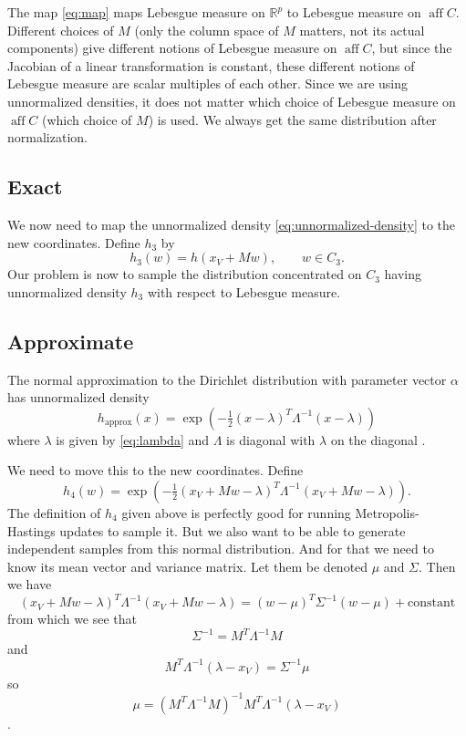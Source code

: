 \documentclass[11pt]{article}
\DeclareMathOperator{\aff}{aff}
\newcommand{\real}{\mathbb{R}}
\begin{document}
The map \eqref{eq:map} maps Lebesgue measure on $\real^p$ to Lebesgue measure
on $\aff C$.  Different choices of $M$ (only the column space of $M$ matters,
not its actual components) give different notions of Lebesgue measure on
$\aff C$, but since the Jacobian of a linear transformation is constant,
these different notions of Lebesgue measure are scalar multiples of each other.
Since we are using unnormalized densities, it does not matter which choice
of Lebesgue measure on $\aff C$ (which choice of $M$) is used.
We always get the same distribution after normalization.

\subsection{Exact}

We now need to map the unnormalized density \eqref{eq:unnormalized-density}
to the new coordinates.  Define $h_3$ by
\begin{equation} \label{eq:h-new}
   h_3(w) = h(x_V + M w), \qquad w \in C_3.
\end{equation}
Our problem is now to sample the distribution concentrated on $C_3$
having unnormalized density $h_3$ with respect to Lebesgue measure.

\subsection{Approximate} \label{sec:approximate}

The normal approximation to the Dirichlet distribution with
parameter vector $\alpha$ has unnormalized density
$$
   h_{\text{approx}}(x)
   =
   \exp\left(- \tfrac{1}{2} (x - \lambda)^T \Lambda^{- 1} (x - \lambda) \right)
$$
where $\lambda$ is given by \eqref{eq:lambda} and $\Lambda$ is diagonal
with $\lambda$ on the diagonal \citep[Theorem~4.2]{geyer-meeden}.

We need to move this to the new coordinates.  Define
\begin{equation} \label{eq:h-approx-new}
   h_4(w)
   =
   \exp\left(- \tfrac{1}{2} (x_V + M w - \lambda)^T
   \Lambda^{- 1} (x_V + M w - \lambda) \right).
\end{equation}
The definition of $h_4$ given above is perfectly good for running
Metropolis-Hastings updates to sample it.  But we also want to
be able to generate independent samples from this normal distribution.
And for that we need to know its mean vector and variance matrix.
Let them be denoted $\mu$ and $\Sigma$.  Then we have
$$
   (x_V + M w - \lambda)^T \Lambda^{- 1} (x_V + M w - \lambda)
   =
   (w - \mu)^T \Sigma^{- 1} (w - \mu) + \text{constant}
$$
from which we see that
\begin{equation} \label{eq:h-approx-new-variance}
   \Sigma^{- 1} = M^T \Lambda^{- 1} M
\end{equation}
and
$$
   M^T \Lambda^{- 1} (\lambda - x_V) = \Sigma^{- 1} \mu
$$
so
\begin{equation} \label{eq:h-approx-new-mean}
   \mu = \left( M^T \Lambda^{- 1} M \right)^{- 1}
   M^T \Lambda^{- 1} (\lambda - x_V)
\end{equation}
\citep[compare equation (25) in][]{geyer-meeden}.
\end{document}
